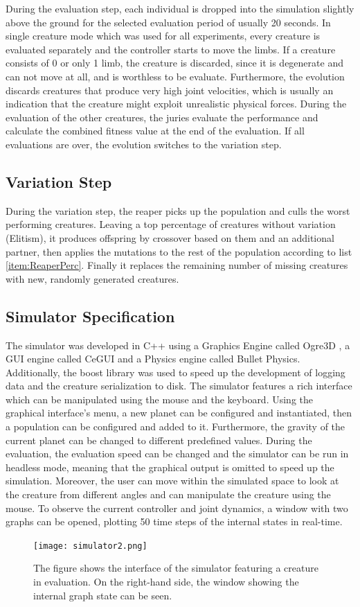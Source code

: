 \documentclass[main]{subfiles}
\begin{document}
During the evaluation step, each individual is dropped into the simulation slightly above the ground for the selected evaluation period of usually 20 seconds. %
%
In single creature mode which was used for all experiments, every creature is evaluated separately and the controller starts to move the limbs. %
%
If a creature consists of 0 or only 1 limb, the creature is discarded, since it is degenerate and can not move at all, and is worthless to be evaluate. %
%
Furthermore, the evolution discards creatures that produce very high joint velocities, which is usually an indication that the creature might exploit unrealistic physical forces. %
%
During the evaluation of the other creatures, the juries evaluate the performance and calculate the combined fitness value at the end of the evaluation. %
%
If all evaluations are over, the evolution switches to the variation step.

\subsection{Variation Step}

During the variation step, the reaper picks up the population and culls the worst performing creatures. %
%
Leaving a top percentage of creatures without variation (Elitism), it produces offspring by crossover based on them and an additional partner, then applies the mutations to the rest of the population according to list \ref{item:ReaperPerc}. %
%
Finally it replaces the remaining number of missing creatures with new, randomly generated creatures.

\subsection{Simulator Specification}

The simulator was developed in C++ using a Graphics Engine called Ogre3D \cite{bib:Ogre3D}, a GUI engine called CeGUI \cite{bib:CEGUI} and a Physics engine called Bullet Physics. %
%
Additionally, the boost library \cite{bib:Boost} was used to speed up the development of logging data and the creature serialization to disk. %
%
The simulator features a rich interface which can be manipulated using the mouse and the keyboard. Using the graphical interface's menu, a new planet can be configured and instantiated, then a population can be configured and added to it. %
%
Furthermore, the gravity of the current planet can be changed to different predefined values. %
%
During the evaluation, the evaluation speed can be changed and the simulator can be run in headless mode, meaning that the graphical output is omitted to speed up the simulation. %
%
Moreover, the user can move within the simulated space to look at the creature from different angles and can manipulate the creature using the mouse. %
%
To observe the current controller and joint dynamics, a window with two graphs can be opened, plotting 50 time steps of the internal states in real-time.

\begin{figure}[H]
\centering
\texttt{[image: simulator2.png]}
\caption[The simulator interface]{The figure shows the interface of the simulator featuring a creature in evaluation. On the right-hand side, the window showing the internal graph state can be seen.}
\label{figure:simulator}
\end{figure}
\end{document}

